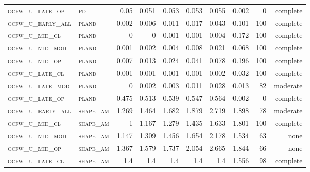\begin{landscape}
\begin{center}
\begin{footnotesize}
\begin{longtable}{llrrrrr|rrr}
\textsc{ocfw\_u\_late\_op  } & \textsc{pd        }    & 0.05     & 0.051    & 0.053    & 0.053    & 0.055     & 0.002         & 0             & complete           \\
\textsc{ocfw\_u\_early\_all} & \textsc{pland     }    & 0.002    & 0.006    & 0.011    & 0.017    & 0.043     & 0.101         & 100           & complete            \\
\textsc{ocfw\_u\_mid\_cl   } & \textsc{pland     }    & 0        & 0        & 0.001    & 0.001    & 0.004     & 0.172         & 100           & complete            \\
\textsc{ocfw\_u\_mid\_mod  } & \textsc{pland     }    & 0.001    & 0.002    & 0.004    & 0.008    & 0.021     & 0.068         & 100           & complete            \\
\textsc{ocfw\_u\_mid\_op   } & \textsc{pland     }    & 0.007    & 0.013    & 0.024    & 0.041    & 0.078     & 0.196         & 100           & complete            \\
\textsc{ocfw\_u\_late\_cl  } & \textsc{pland     }    & 0.001    & 0.001    & 0.001    & 0.001    & 0.002     & 0.032         & 100           & complete            \\
\textsc{ocfw\_u\_late\_mod } & \textsc{pland     }    & 0        & 0.002    & 0.003    & 0.011    & 0.028     & 0.013         & 82            & moderate       \\
\textsc{ocfw\_u\_late\_op  } & \textsc{pland     }    & 0.475    & 0.513    & 0.539    & 0.547    & 0.564     & 0.002         & 0             & complete           \\
\textsc{ocfw\_u\_early\_all} & \textsc{shape\_am }    & 1.269    & 1.464    & 1.682    & 1.879    & 2.719     & 1.898         & 78            & moderate       \\
\textsc{ocfw\_u\_mid\_cl   } & \textsc{shape\_am }    & 1        & 1.167    & 1.279    & 1.435    & 1.633     & 1.801         & 100           & complete            \\
\textsc{ocfw\_u\_mid\_mod  } & \textsc{shape\_am }    & 1.147    & 1.309    & 1.456    & 1.654    & 2.178     & 1.534         & 63            & none       \\
\textsc{ocfw\_u\_mid\_op   } & \textsc{shape\_am }    & 1.367    & 1.579    & 1.737    & 2.054    & 2.665     & 1.844         & 66            & none       \\
\textsc{ocfw\_u\_late\_cl  } & \textsc{shape\_am }    & 1.4      & 1.4      & 1.4      & 1.4      & 1.4       & 1.556         & 98            & complete       \\

\end{longtable}
\end{footnotesize}
\end{center}
\end{landscape}
